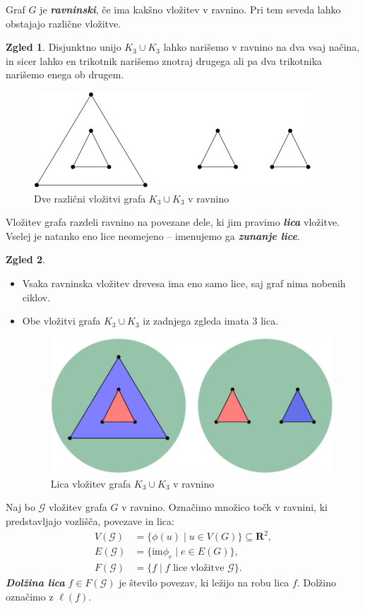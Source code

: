 \documentclass[11pt]{book}
\def\RR{\mathbf{R}}
\def\GG{\mathcal{G}}
\def\definicija{\color{rdeca}\bf\em}
\theoremstyle{definition}
\theoremstyle{zgled}
\newtheorem*{zgled}{Zgled}
\theoremstyle{odprtproblem}
\theoremstyle{domacanaloga}
\theoremstyle{izrek}
\begin{document}
Graf $G$ je {\definicija ravninski}, če ima kakšno vložitev v ravnino. Pri tem seveda lahko obstajajo različne vložitve.

\begin{zgled}
Disjunktno unijo $K_3 \cup K_3$ lahko narišemo v ravnino na dva vsaj načina, in sicer lahko en trikotnik narišemo znotraj drugega ali pa dva trikotnika narišemo enega ob drugem.

\begin{figure}[h]
    \centering
    \includegraphics[width=0.5\linewidth]{img/grafi-ravninski-k3k3.png}
    \caption{Dve različni vložitvi grafa $K_3 \cup K_3$ v ravnino}
\end{figure} 
\end{zgled}

Vložitev grafa razdeli ravnino na povezane dele, ki jim pravimo {\definicija lica} vložitve. Vselej je natanko eno lice neomejeno -- imenujemo ga {\definicija zunanje lice}.

\begin{zgled} \leavevmode
    \begin{itemize}
        \item Vsaka ravninska vložitev drevesa ima eno samo lice, saj graf nima nobenih ciklov.
        \item Obe vložitvi grafa $K_3 \cup K_3$ iz zadnjega zgleda imata $3$ lica.

\begin{figure}[h]
    \centering
    \includegraphics[width=0.5\linewidth]{img/grafi-ravninski-k3k3-lica.png}
    \caption{Lica vložitev grafa $K_3 \cup K_3$ v ravnino}
\end{figure} 
\end{itemize}
\end{zgled}


Naj bo $\GG$ vložitev grafa $G$ v ravnino. Označimo množico točk v ravnini, ki predstavljajo vozlišča, povezave in lica:
\begin{align*}
    V(\GG) &= \{ \phi(u) \mid u \in V(G) \} \subseteq \RR^2, \\
    E(\GG) &= \{ \mathrm{im} \phi_e \mid e \in E(G) \}, \\
    F(\GG) &= \{ f \mid \text{$f$ lice vložitve $\GG$}\}.
\end{align*}
{\definicija Dolžina lica} $f \in F(\GG)$ je število povezav, ki ležijo na robu lica $f$. Dolžino označimo z $\ell(f)$.
\end{document}

